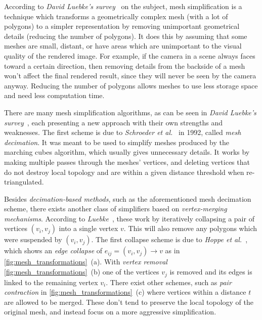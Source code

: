 According to \emph{David Luebke's survey}~\cite{luebke2001developer} on the subject, mesh simplification is a technique which transforms a geometrically complex mesh (with a lot of polygons) to a simpler representation by removing unimportant geometrical details (reducing the number of polygons). It does this by assuming that some meshes are small, distant, or have areas which are unimportant to the visual quality of the rendered image. For example, if the camera in a scene always faces toward a certain direction, then removing details from the backside of a mesh won't affect the final rendered result, since they will never be seen by the camera anyway. Reducing the number of polygons allows meshes to use less storage space and need less computation time.

There are many mesh simplification algorithms, as can be seen in \emph{David Luebke's survey}~\cite{luebke2001developer}, each presenting a new approach with their own strengths and weaknesses. The first scheme is due to \emph{Schroeder et al.}~\cite{schroeder1992decimation} in 1992, called \emph{mesh decimation}. It was meant to be used to simplify meshes produced by the marching cubes algorithm, which usually gives unnecessary details. It works by making multiple passes through the meshes' vertices, and deleting vertices that do not destroy local topology and are within a given distance threshold when re-triangulated.

Besides \emph{decimation-based methods}, such as the aforementioned mesh decimation scheme, there exists another class of simplifiers based on \emph{vertex-merging mechanisms}. According to \emph{Luebke}~\cite{luebke2001developer}, these work by iteratively collapsing a pair of vertices \((v_i, v_j)\) into a single vertex \(v\). This will also remove any polygons which were suspended by \((v_i, v_j)\). The first collapse scheme is due to \emph{Hoppe et al.}~\cite{hoppe1993mesh}, which shows an \emph{edge collapse} of \(e_{ij} = (v_i, v_j) \rightarrow v\) as in \cref{fig:mesh_transformations}~(a). With \emph{vertex removal} \cref{fig:mesh_transformations}~(b) one of the vertices \(v_j\) is removed and its edges is linked to the remaining vertex \(v_i\). There exist other schemes, such as \emph{pair contraction} in \cref{fig:mesh_transformations}~(c) where vertices within a distance \(t\) are allowed to be merged. These don't tend to preserve the local topology of the original mesh, and instead focus on a more aggressive simplification.

